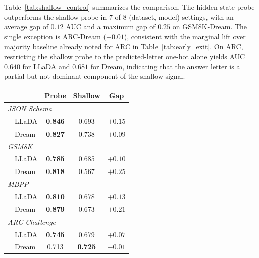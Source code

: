 \documentclass[11pt]{article}
\providecommand{\linenumbers}{}
\providecommand{\nolinenumbers}{}
\begin{document}
Table~\ref{tab:shallow_control} summarizes the comparison.
The hidden-state probe outperforms the shallow probe in 7 of 8 (dataset, model) settings, with an average gap of $0.12$ AUC and a maximum gap of $0.25$ on \mbox{GSM8K-Dream}.
The single exception is \mbox{ARC-Dream} ($-0.01$), consistent with the marginal lift over majority baseline already noted for ARC in Table~\ref{tab:early_exit}.
On ARC, restricting the shallow probe to the predicted-letter one-hot alone yields AUC $0.640$ for LLaDA and $0.681$ for Dream, indicating that the answer letter is a partial but not dominant component of the shallow signal.

\nolinenumbers
\begin{center}
  \small
  \label{tab:shallow_control}
  \begin{tabular}{lccc}
    \toprule
    & \textbf{Probe} & \textbf{Shallow} & \textbf{Gap} \\
    \midrule
    \multicolumn{4}{l}{\textit{JSON Schema}} \\
    ~~LLaDA & \textbf{0.846} & 0.693 & $+0.15$ \\
    ~~Dream & \textbf{0.827} & 0.738 & $+0.09$ \\
    \midrule
    \multicolumn{4}{l}{\textit{GSM8K}} \\
    ~~LLaDA & \textbf{0.785} & 0.685 & $+0.10$ \\
    ~~Dream & \textbf{0.818} & 0.567 & $+0.25$ \\
    \midrule
    \multicolumn{4}{l}{\textit{MBPP}} \\
    ~~LLaDA & \textbf{0.810} & 0.678 & $+0.13$ \\
    ~~Dream & \textbf{0.879} & 0.673 & $+0.21$ \\
    \midrule
    \multicolumn{4}{l}{\textit{ARC-Challenge}} \\
    ~~LLaDA & \textbf{0.745} & 0.679 & $+0.07$ \\
    ~~Dream & 0.713 & \textbf{0.725} & $-0.01$ \\
    \bottomrule
  \end{tabular}
\end{center}
\linenumbers
\end{document}
